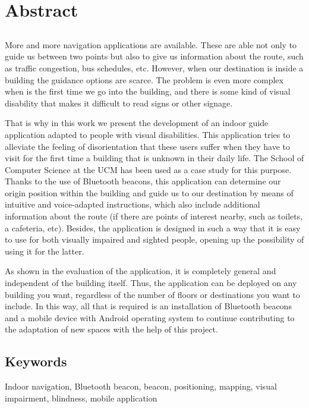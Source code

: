 \chapter*{Abstract}


\section*{}

More and more navigation applications are available. These are able not only to guide us between two points but also to give us information about the route, such as traffic congestion, bus schedules, etc. However, when our destination is inside a building the guidance options are scarce. The problem is even more complex when is the first time we go into the building, and there is some kind of visual disability that makes it difficult to read signs or other signage.

That is why in this work we present the development of an indoor guide application adapted to people with visual disabilities. This application tries to alleviate the feeling of disorientation that these users suffer when they have to visit for the first time a building that is unknown in their daily life. The School of Computer Science at the UCM has been used as a case study for this purpose. Thanks to the use of Bluetooth beacons, this application can determine our origin position within the building and guide us to our destination by means of intuitive and voice-adapted instructions, which also include additional information about the route (if there are points of interest nearby, such as toilets, a cafeteria, etc). Besides, the application is designed in such a way that it is easy to use for both visually impaired and sighted people, opening up the possibility of using it for the latter.

As shown in the evaluation of the application, it is completely general and independent of the building itself. Thus, the application can be deployed on any building you want, regardless of the number of floors or destinations you want to include.  In this way, all that is required is an installation of Bluetooth beacons and a mobile device with Android operating system to continue contributing to the adaptation of new spaces with the help of this project.

\section*{Keywords}

\noindent Indoor navigation, Bluetooth beacon, beacon, positioning, mapping, visual impairment, blindness, mobile application




